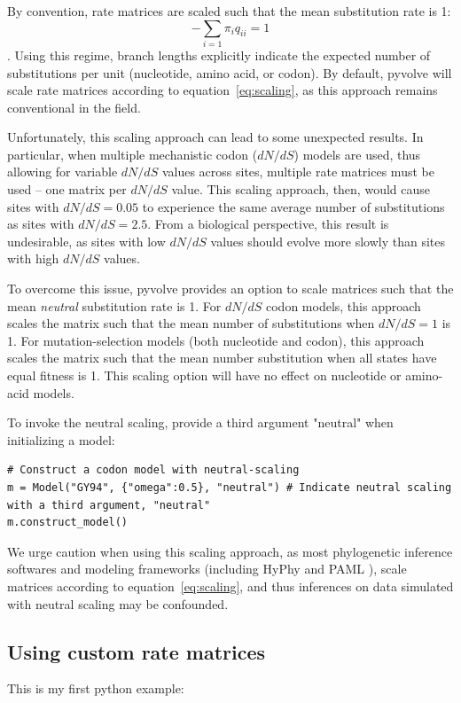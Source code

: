 \documentclass{article}
\newcommand\pythonexternal[2][]{{
		}}
\begin{document}
By convention, rate matrices are scaled such that the mean substitution rate is 1:
\begin{equation}\label{eq:scaling}
- \sum_{i=1} \pi_iq_{ii} = 1
\end{equation}
 \citep{GY94,Yang1994}. Using this regime, branch lengths explicitly indicate the expected number of substitutions per unit (nucleotide, amino acid, or codon). By default, pyvolve will scale rate matrices according to equation~\ref{eq:scaling}, as this approach remains conventional in the field. 
 
Unfortunately, this scaling approach can lead to some unexpected results. In particular, when multiple mechanistic codon ($dN/dS$) models are used, thus allowing for variable $dN/dS$ values across sites, multiple rate matrices must be used -- one matrix per $dN/dS$ value. This scaling approach, then, would cause sites with $dN/dS = 0.05$ to experience the same average number of substitutions as sites with $dN/dS = 2.5$. From a biological perspective, this result is undesirable, as sites with low $dN/dS$ values should evolve more slowly than sites with high $dN/dS$ values.
 
To overcome this issue, pyvolve provides an option to scale matrices such that the mean \textit{neutral} substitution rate is 1. For $dN/dS$ codon models, this approach scales the matrix such that the mean number of substitutions when $dN/dS = 1$ is 1. For mutation-selection models (both nucleotide and codon), this approach scales the matrix such that the mean number substitution when all states have equal fitness is 1. This scaling option will have no effect on nucleotide or amino-acid models.

To invoke the neutral scaling, provide a third argument "neutral" when initializing a model:
\begin{lstlisting}
# Construct a codon model with neutral-scaling
m = Model("GY94", {"omega":0.5}, "neutral") # Indicate neutral scaling with a third argument, "neutral"
m.construct_model()
\end{lstlisting}

We urge caution when using this scaling approach, as most phylogenetic inference softwares and modeling frameworks (including HyPhy \citep{HYPHY} and PAML \citep{PAML}), scale matrices according to equation~\ref{eq:scaling}, and thus inferences on data simulated with neutral scaling may be confounded.


\subsection{Using custom rate matrices}\label{sec:custom}




\noindent This is my first python example:

\pythonexternal{script.py}














\end{document}
